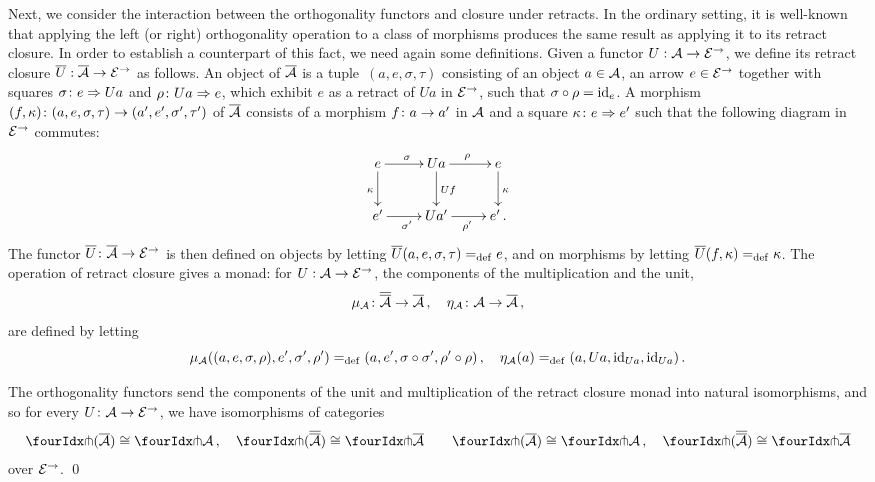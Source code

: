 \documentclass[reqno,10pt,a4paper,oneside]{amsart}
\begin{document}
\medskip

Next, we consider the interaction between the orthogonality functors and closure under retracts. In the ordinary setting, it is well-known that
applying the left (or right) orthogonality operation to a class of morphisms produces the same result as applying it to its retract closure. 
In order to establish a counterpart of this fact, we need again some definitions. 
Given a  functor $U : \cal{A} \to \catE^{\to}$, we define its retract closure $\overline{U} : \overline{\cal{A}} \to \catE^{\to}$ as follows. 
An object of $\overline{\cal{A}}$ is a tuple~$(a, e, \sigma, \tau)$ consisting of an object $a \in \cal{A}$, an arrow $e \in \cal{E}^\to$ together with squares $\sigma \co e \Rightarrow Ua$ and $\rho \co Ua \Rightarrow e$,
which exhibit $e$ as a retract of $U a$ in  $\catE^{\to}$,  \ie such that $\sigma \cc \rho = \id_e$. 
A morphism $(f, \kappa) \co (a, e, \sigma, \tau) \to (a', e', \sigma', \tau')$ of $\overline{\cal{A}}$  consists of a morphism $f \co a \to a'$ in $\cal{A}$ and a square $\kappa \co e \Rightarrow e'$  such that the following diagram in $\cal{E}^\to$ commutes:
\[
\xymatrix{
  e
  \ar[r]^{\sigma}
    \ar[d]_{\kappa}
&
  U a
  \ar[r]^{\rho}
  \ar[d]^{U f}
&
  e
  \ar[d]^{\kappa}
\\
  e'
  \ar[r]_{\sigma'}
&
  Ua'
  \ar[r]_{\rho'}
&
  e' \, .
}
\]
The functor $\overline{U} \co \overline{\cal{A}} \to \catE^\to$ is then defined  on objects  by letting $\overline{U}(a, e, \sigma, \tau) \defeq e$,
and on morphisms by letting $\overline{U}(f, \kappa) \defeq \kappa$. The operation of retract closure gives a monad: for $U : \cal{A} \to \catE^{\to}$,
the components of the multiplication and the unit, 
\[
\mu_\cal{A} \co \overline{\overline{\cal{A}}} \to \overline{\cal{A}} \, , \quad
\eta_\cal{A} \co \cal{A} \to \overline{\cal{A}} \, ,
\]
are defined by letting
\[
\mu_\cal{A}((a, e, \sigma,  \rho), e', \sigma', \rho') \defeq (a, e', \sigma \cc \sigma', \rho' \cc \rho) \, , \quad
\eta_\cal{A}(a) \defeq (a, Ua, \id_{Ua}, \id_{Ua}) \, .
\]




\begin{proposition}
\label{retract-closure}
The orthogonality functors send the components of the unit and multiplication of the retract closure monad into natural
isomorphisms, and so for every $U \co \cal{A} \to \catE^\to$, we have isomorphisms of categories
\begin{gather*} 
 \liftr{(\overline{\cal{A}})} \iso \liftr{\cal{A}} \, , \quad
 \liftr{(\overline{\overline{\cal{A}}})} \iso \liftr{\overline{\cal{A}}}  \qquad
 \liftl{(\overline{\cal{A}})} \iso \liftl{\cal{A}} \, , \quad
 \liftl{(\overline{\overline{\cal{A}}})} \iso \liftl{\overline{\cal{A}}}
\end{gather*} 
over $\catE^\to$. \qed
\end{proposition}
\end{document}
